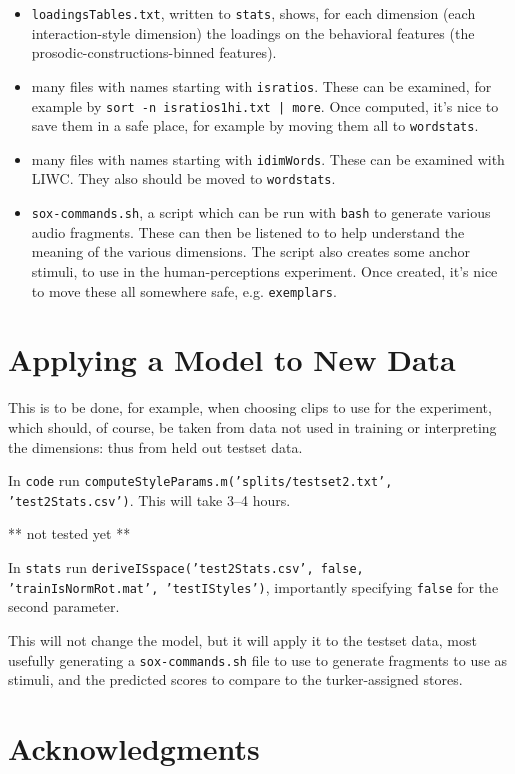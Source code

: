 \documentclass[11pt]{article}
\begin{document}
\begin{itemize}   \setlength{\itemsep}{0pt}\setlength{\parskip}{0pt}
\item {\tt loadingsTables.txt}, written to {\tt stats}, shows, for each
  dimension (each interaction-style dimension) the loadings on the
  behavioral features (the prosodic-constructions-binned features).
\item many files with names starting with {\tt isratios}.  These can
  be examined, for example by {\tt sort -n isratios1hi.txt | more}.
  Once computed, it's nice to save them in a safe place, for example
  by moving them all to {\tt wordstats}. 
\item many files with names starting with {\tt idimWords}.  These can
  be examined with LIWC.  They also should be moved to {\tt wordstats}.
\item {\tt sox-commands.sh}, a script which can be run with {\tt bash}
  to generate various audio fragments.  These can then be listened to
  to help understand the meaning of the various dimensions.  The
  script also creates some anchor stimuli, to use in the
  human-perceptions experiment.  Once created, it's nice to move these
  all somewhere safe, e.g. {\tt exemplars}.
\end{itemize}

\section{Applying a Model to New Data}

This is to be done, for example, when choosing clips to use for the
experiment, which should, of course, be taken from data not used in
training or interpreting the dimensions: thus from held out testset
data.

In {\tt code} run {\tt computeStyleParams.m('splits/testset2.txt',
  'test2Stats.csv')}.  This will take  3--4 hours.

** not tested yet **

In {\tt stats} run {\tt deriveISspace('test2Stats.csv', false,
  'trainIsNormRot.mat', 'testIStyles')}, importantly specifying {\tt false} for the
second parameter.

This will not change the model, but it will apply it to the testset
data, most usefully generating a {\tt sox-commands.sh} file to use to
generate fragments to use as stimuli, and the predicted scores to
compare to the turker-assigned stores. 


\section{Acknowledgments }  



%

\end{document}
